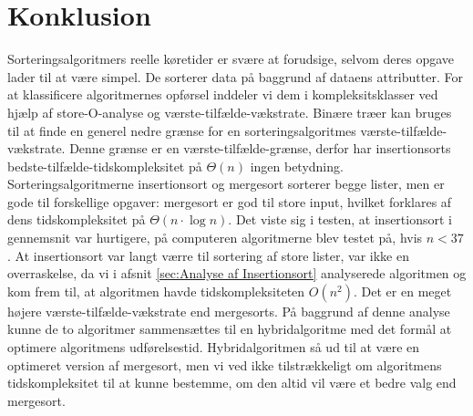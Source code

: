 \chapter{Konklusion}
\label{ch:Konklusion}

Sorteringsalgoritmers reelle køretider er svære at forudsige, selvom deres opgave lader til at være simpel. De sorterer data på baggrund af dataens attributter. For at klassificere algoritmernes opførsel inddeler vi dem i kompleksitsklasser ved hjælp af store-O-analyse og værste-tilfælde-vækstrate. Binære træer kan bruges til at finde en generel nedre grænse for en sorteringsalgoritmes værste-tilfælde-vækstrate. Denne grænse er en værste-tilfælde-grænse, derfor har insertionsorts bedste-tilfælde-tidskompleksitet på $\Theta (n)$ ingen betydning. Sorteringsalgoritmerne insertionsort og mergesort sorterer begge lister, men er gode til forskellige opgaver: mergesort er god til store input, hvilket forklares af dens tidskompleksitet på $\Theta (n \cdot \log n)$. Det viste sig i testen, at insertionsort i gennemsnit var hurtigere, på computeren algoritmerne blev testet på, hvis $n < 37$. At insertionsort var langt værre til sortering af store lister, var ikke en overraskelse, da vi i afsnit \ref{sec:Analyse af Insertionsort} analyserede algoritmen og kom frem til, at algoritmen havde tidskompleksiteten $O(n^2)$. Det er en meget højere værste-tilfælde-vækstrate end mergesorts. På baggrund af denne analyse kunne de to algoritmer sammensættes til en hybridalgoritme med det formål at optimere algoritmens udførelsestid. Hybridalgoritmen så ud til at være en optimeret version af mergesort, men vi ved ikke tilstrækkeligt om algoritmens tidskompleksitet til at kunne bestemme, om den altid vil være et bedre valg end mergesort.
